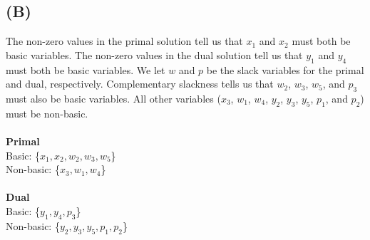 \documentclass[12pt]{article}
\begin{document}
\subsection*{(B)}
The non-zero values in the primal solution tell us that $x_1$ and $x_2$ must both be basic variables. The non-zero values in the dual solution tell us that $y_1$ and $y_4$ must both be basic variables. We let $w$ and $p$ be the slack variables for the primal and dual, respectively. Complementary slackness tells us that $w_2$, $w_3$, $w_5$, and $p_3$ must also be basic variables. All other variables ($x_3$, $w_1$, $w_4$, $y_2$, $y_3$, $y_5$, $p_1$, and $p_2$) must be non-basic. \\
\\
\textbf{Primal} \\
Basic: \{$x_1, x_2, w_2, w_3, w_5$\}\\
Non-basic: \{$x_3, w_1, w_4$\} \\
\\
\textbf{Dual} \\
Basic: \{$y_1, y_4, p_3$\} \\
Non-basic: \{$y_2, y_3, y_5, p_1, p_2$\}

\newpage
\end{document}
